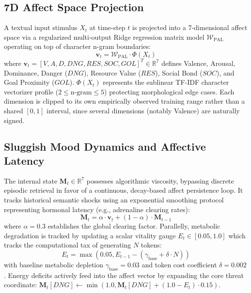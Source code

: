 \documentclass[10pt,twocolumn]{article}
\begin{document}
\subsection{7D Affect Space Projection}
A textual input stimulus $X_t$ at time-step $t$ is projected into a 7-dimensional affect space via a regularized multi-output Ridge regression matrix model $\mathcal{W}_{\text{PAL}}$ operating on top of character n-gram boundaries:
\begin{equation}
\mathbf{v}_t = \mathcal{W}_{\text{PAL}} \cdot \Phi(X_t)
\end{equation}
where $\mathbf{v}_t = [V, A, D, DNG, RES, SOC, GOL]^T \in \mathbb{R}^7$ defines Valence, Arousal, Dominance, Danger ($DNG$), Resource Value ($RES$), Social Bond ($SOC$), and Goal Proximity ($GOL$). $\Phi(X_t)$ represents the sublinear TF-IDF character vectorizer profile ($2 \le \text{n-gram} \le 5$) protecting morphological edge cases. Each dimension is clipped to its own empirically observed training range rather than a shared $[0,1]$ interval, since several dimensions (notably Valence) are naturally signed.

\subsection{Sluggish Mood Dynamics and Affective Latency}
The internal state $\mathbf{M}_t \in \mathbb{R}^7$ possesses algorithmic viscosity, bypassing discrete episodic retrieval in favor of a continuous, decay-based affect persistence loop. It tracks historical semantic shocks using an exponential smoothing protocol representing hormonal latency (e.g., adrenaline clearing rates):
\begin{equation}
\mathbf{M}_t = \alpha \cdot \mathbf{v}_t + (1 - \alpha) \cdot \mathbf{M}_{t-1}
\end{equation}
where $\alpha = 0.3$ establishes the global clearing factor. Parallelly, metabolic degradation is tracked by updating a scalar vitality gauge $E_t \in [0.05, 1.0]$ which tracks the computational tax of generating $N$ tokens:
\begin{equation}
E_t = \max(0.05, E_{t-1} - (\gamma_{\text{base}} + \delta \cdot N))
\end{equation}
with baseline metabolic depletion $\gamma_{\text{base}} = 0.03$ and token cost coefficient $\delta = 0.002$. Energy deficits actively feed into the affect vector by expanding the core threat coordinate: $\mathbf{M}_t[DNG] \leftarrow \min(1.0, \mathbf{M}_t[DNG] + (1.0 - E_t) \cdot 0.15)$.
\end{document}
